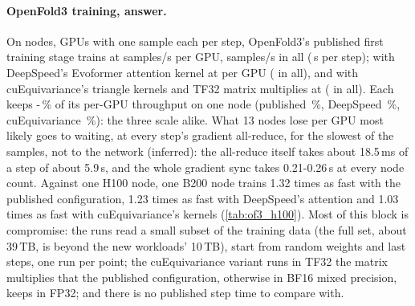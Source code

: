 \paragraph{OpenFold3 training, answer.} On \TriOfTopNodes{} nodes, \TriOfTopGpus{} GPUs with one sample each per step, OpenFold3's published first training stage trains at \TriOfSpsPubThirteen{} samples/s per GPU, \TriOfTotalPubThirteen{} samples/s in all (\TriOfStepPubThirteen\,s per step); with DeepSpeed's Evoformer attention kernel at \TriOfSpsDsThirteen{} per GPU (\TriOfTotalDsThirteen{} in all), and with cuEquivariance's triangle kernels and TF32 matrix multiplies at \TriOfSpsCueqThirteen{} (\TriOfTotalCueqThirteen{} in all). Each keeps \TriOfEffLo-\TriOfEffHi\,\% of its per-GPU throughput on one node (published \TriOfEffPubThirteen\,\%, DeepSpeed \TriOfEffDsThirteen\,\%, cuEquivariance \TriOfEffCueqThirteen\,\%): the three scale alike. What 13 nodes lose per GPU most likely goes to waiting, at every step's gradient all-reduce, for the slowest of the \TriOfTopGpus{} samples, not to the network (inferred): the all-reduce itself takes about 18.5\,ms of a step of about 5.9\,s, and the whole gradient sync takes 0.21-0.26\,s at every node count. Against one H100 node, one B200 node trains 1.32 times as fast with the published configuration, 1.23 times as fast with DeepSpeed's attention and 1.03 times as fast with cuEquivariance's kernels (\cref{tab:of3_h100}). Most of this block is compromise: the runs read a small subset of the training data (the full set, about 39\,TB, is beyond the new workloads' 10\,TB), start from random weights and last \TriOfSteps{} steps, one run per point; the cuEquivariance variant runs in TF32 the matrix multiplies that the published configuration, otherwise in BF16 mixed precision, keeps in FP32; and there is no published step time to compare with.

